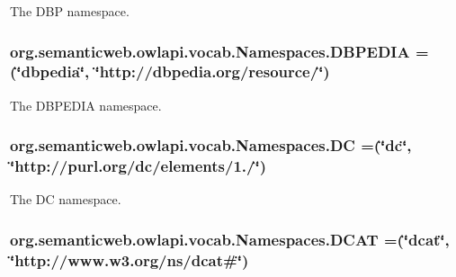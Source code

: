The D\-B\-P namespace. \hypertarget{enumorg_1_1semanticweb_1_1owlapi_1_1vocab_1_1_namespaces_a84d3c2f2ca5452fdcc748b7b36301c0b}{
\subsubsection[{D\-B\-P\-E\-D\-I\-A}]{\setlength{\rightskip}{0pt plus 5cm}org.\-semanticweb.\-owlapi.\-vocab.\-Namespaces.\-D\-B\-P\-E\-D\-I\-A =(\char`\"{}dbpedia\char`\"{}, \char`\"{}http\-://dbpedia.\-org/resource/\char`\"{})}}\label{enumorg_1_1semanticweb_1_1owlapi_1_1vocab_1_1_namespaces_a84d3c2f2ca5452fdcc748b7b36301c0b}
The D\-B\-P\-E\-D\-I\-A namespace. \hypertarget{enumorg_1_1semanticweb_1_1owlapi_1_1vocab_1_1_namespaces_a6969b58351a73a1264d8c2a738bd3bf1}{
\subsubsection[{D\-C}]{\setlength{\rightskip}{0pt plus 5cm}org.\-semanticweb.\-owlapi.\-vocab.\-Namespaces.\-D\-C =(\char`\"{}dc\char`\"{}, \char`\"{}http\-://purl.\-org/dc/elements/1./\char`\"{})}}\label{enumorg_1_1semanticweb_1_1owlapi_1_1vocab_1_1_namespaces_a6969b58351a73a1264d8c2a738bd3bf1}
The D\-C namespace. \hypertarget{enumorg_1_1semanticweb_1_1owlapi_1_1vocab_1_1_namespaces_a1852577e65cfc0f7ffa8c80790f06195}{
\subsubsection[{D\-C\-A\-T}]{\setlength{\rightskip}{0pt plus 5cm}org.\-semanticweb.\-owlapi.\-vocab.\-Namespaces.\-D\-C\-A\-T =(\char`\"{}dcat\char`\"{}, \char`\"{}http\-://www.\-w3.\-org/{\bf ns}/dcat\#\char`\"{})}}\label{enumorg_1_1semanticweb_1_1owlapi_1_1vocab_1_1_namespaces_a1852577e65cfc0f7ffa8c80790f06195}
